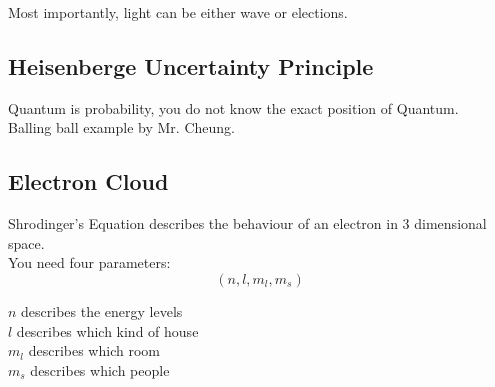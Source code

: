 \documentclass[11pt]{report}
\theoremstyle{remark}
\begin{document}
Most importantly, light can be either wave or elections.

\subsection{Heisenberge Uncertainty Principle}
Quantum is probability, you do not know the exact position of Quantum. \\
Balling ball example by Mr. Cheung.

\subsection{Electron Cloud}
Shrodinger's Equation describes the behaviour of an electron in 3 dimensional space. \\
You need four parameters:\\ 
\begin{equation}
    (n, l, m_{l}, m_{s})
\end{equation}
\begin{center}
    $n$ describes the energy levels\\
    $l$ describes which kind of house\\ 
    $m_{l}$ describes which room \\ 
    $m_{s}$ describes which people \\
\end{center}
\end{document}
